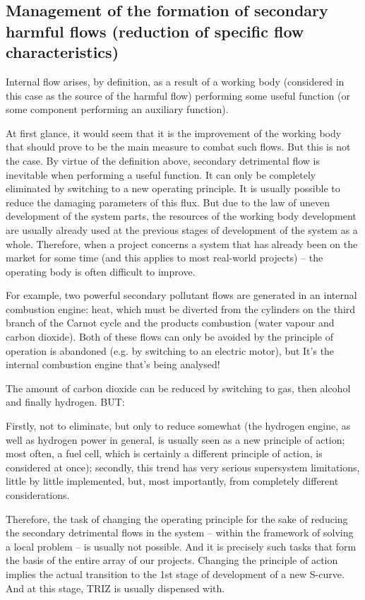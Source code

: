 \documentclass[a4paper,11pt]{article}
\begin{document}
\subsection{Management of the formation of secondary harmful flows (reduction
  of specific flow characteristics)} 

Internal flow arises, by definition, as a result of a working body (considered
in this case as the source of the harmful flow) performing some useful
function (or some component performing an auxiliary function).

At first glance, it would seem that it is the improvement of the working body
that should prove to be the main measure to combat such flows. But this is not
the case. By virtue of the definition above, secondary detrimental flow is
inevitable when performing a useful function. It can only be completely
eliminated by switching to a new operating principle. It is usually possible
to reduce the damaging parameters of this flux. But due to the law of uneven
development of the system parts, the resources of the working body development
are usually already used at the previous stages of development of the system
as a whole. Therefore, when a project concerns a system that has already been
on the market for some time (and this applies to most real-world projects) --
the operating body is often difficult to improve.

For example, two powerful secondary pollutant flows are generated in an
internal combustion engine: heat, which must be diverted from the cylinders on
the third branch of the Carnot cycle and the products combustion (water vapour
and carbon dioxide). Both of these flows can only be avoided by the principle
of operation is abandoned (e.g. by switching to an electric motor), but It's
the internal combustion engine that's being analysed!

The amount of carbon dioxide can be reduced by switching to gas, then alcohol
and finally hydrogen. BUT:

Firstly, not to eliminate, but only to reduce somewhat (the hydrogen engine,
as well as hydrogen power in general, is usually seen as a new principle of
action; most often, a fuel cell, which is certainly a different principle of
action, is considered at once); secondly, this trend has very serious
supersystem limitations, little by little implemented, but, most importantly,
from completely different considerations.

Therefore, the task of changing the operating principle for the sake of
reducing the secondary detrimental flows in the system -- within the framework
of solving a local problem -- is usually not possible. And it is precisely
such tasks that form the basis of the entire array of our projects. Changing
the principle of action implies the actual transition to the 1st stage of
development of a new S-curve. And at this stage, TRIZ is usually dispensed
with.
\end{document}
